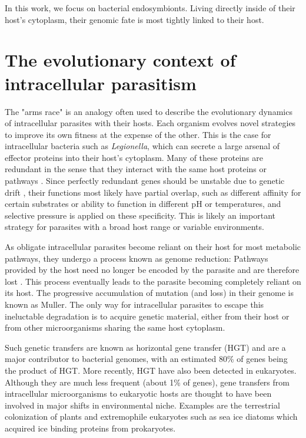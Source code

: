 In this work, we  focus on bacterial endosymbionts. Living directly inside of their host's cytoplasm, their genomic fate is most tightly linked to their host.

\section{The evolutionary context of intracellular parasitism}

The "arms race" is an analogy often used to describe the evolutionary dynamics of intracellular parasites with their hosts. Each organism evolves novel strategies to improve its own fitness at the expense of the other. This is the case for intracellular bacteria such as \textit{Legionella}, which can secrete a large arsenal of effector proteins into their host's cytoplasm. Many of these proteins are redundant in the sense that they interact with the same host proteins or pathways \cite{Ghosh2017}. Since perfectly redundant genes should be unstable due to genetic drift \cite{Bergthorsson2007}, their functions most likely have partial overlap, such as different affinity for certain substrates or ability to function in different pH or temperatures, and selective pressure is applied on these specificity. This is likely an important strategy for parasites with a broad host range or variable environments.

As obligate intracellular parasites become reliant on their host for most metabolic pathways, they undergo a process known as genome reduction: Pathways provided by the host need no longer be encoded by the parasite and are therefore lost \cite{McCutcheon2012}. This process eventually leads to the parasite becoming completely reliant on its host. The progressive accumulation of mutation (and loss) in their genome is known as \Gls{Muller}. The only way for intracellular parasites to escape this ineluctable degradation is to acquire genetic material, either from their host or from other microorganisms sharing the same host cytoplasm.

Such genetic transfers are known as horizontal gene transfer (HGT) and are a major contributor to bacterial genomes, with an estimated 80\% of genes being the product of HGT. More recently, HGT have also been detected in eukaryotes. Although they are much less frequent (about 1\% of genes), gene transfers from intracellular microorganisms to eukaryotic hosts are thought to have been involved in major shifts in environmental niche. Examples are the terrestrial colonization of plants and extremophile eukaryotes such as sea ice diatoms which acquired ice binding proteins from prokaryotes.

